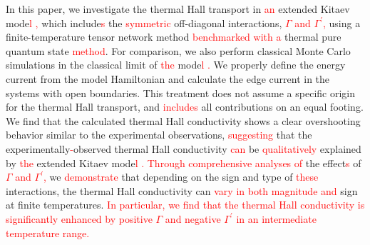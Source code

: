 \documentclass[twocolumn,superscriptaddress,showpacs, longbibliography, aps, prb]{revtex4-2}
\newcommand{\red}[1]{\textcolor{red}{#1}}
\begin{document}
\if0{
One possible origin of the thermal Hall transport at finite temperatures %
is topological magnons, which are excited from the magnetic order induced by %
applied magnetic fields \cite{McClartyDGRPMP2018,Joshi2018}. 
The edge modes due to such topological magnons %
have
a nonzero gap, %
so that the
thermal Hall transport %
vanishes in the zero temperature limit. 
However, at finite temperatures, we need to consider %
contributions from such topological 
magnons in addition to the contributions from the Majorana fermions. 
In realistic situations, the thermal Hall transport might not be 
explained solely by either the Majorana fermions or bosonic quasiparticles such as topological magnons and phonons.
To understand the thermal Hall transport at %
finite temperatures, 
an unbiased %
approach is required to handle the complex interplay of
these contributions.
}\fi

In this paper, we investigate the thermal Hall transport in 
\red{an} extended Kitaev mode\red{l%
,} which include\red{s} the \red{symmetric} off-diagonal interactions, \red{$\Gamma$ and $\Gamma^\prime$,} 
using a finite-temperature tensor network method %
\red{benchmarked with a}
thermal pure quantum state %
\red{method}. 
For comparison, we also perform %
classical Monte Carlo simulations
in the classical limit of %
\red{the} mode\red{l%
.}
We properly define the energy current from the model Hamiltonian 
and calculate the edge current in the systems with open boundaries. 
This treatment does not assume %
a specific origin for %
the thermal Hall transport, 
and %
\red{includes} all contributions on an equal footing.  
We find that %
the calculated thermal Hall conductivity shows a clear overshooting behavior similar to the experimental observations, %
\red{suggesting} that the experimentally\red{-}observed thermal Hall conductivity %
\red{can} be \red{qualitatively} explained by %
\red{the} extended Kitaev mode\red{l%
.}
\red{Through comprehensive analyses of} the effect\red{s} of %
\red{$\Gamma$ and $\Gamma^\prime$,} 
we %
\red{demonstrate} that depending on the sign and %
type of %
\red{these} interactions, the thermal Hall conductivity can %
\red{vary in both magnitude and} %
sign at finite temperatures. 
\red{In particular, we find that the thermal Hall conductivity is significantly enhanced by positive $\Gamma$ and negative $\Gamma^\prime$ in an intermediate temperature range.} 
\end{document}
